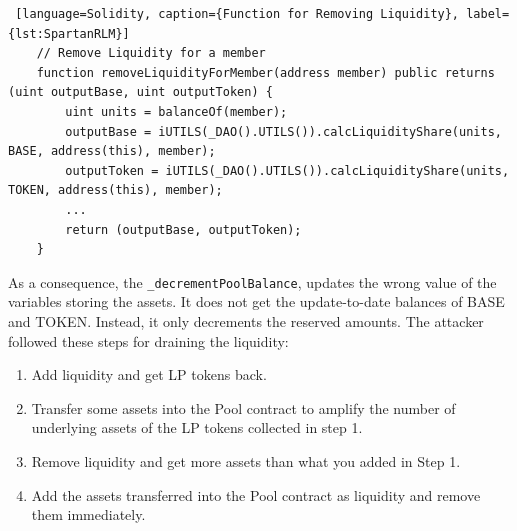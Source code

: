 \begin{lstlisting} [language=Solidity, caption={Function for Removing Liquidity}, label={lst:SpartanRLM}]
    // Remove Liquidity for a member
    function removeLiquidityForMember(address member) public returns (uint outputBase, uint outputToken) {
        uint units = balanceOf(member);
        outputBase = iUTILS(_DAO().UTILS()).calcLiquidityShare(units, BASE, address(this), member);
        outputToken = iUTILS(_DAO().UTILS()).calcLiquidityShare(units, TOKEN, address(this), member);
        ...
        return (outputBase, outputToken);
    }
\end{lstlisting}
As a consequence, the \texttt{\_decrementPoolBalance}, updates the  wrong value of the variables storing the assets. 
It does not get the update-to-date balances of BASE and TOKEN. Instead, it only decrements the reserved amounts.
The attacker followed these steps for draining the liquidity:
\begin{enumerate}
    \item Add liquidity and get LP tokens back.
    \item Transfer some assets into the Pool contract to amplify the number of underlying assets of the LP tokens collected in step 1.
    \item Remove liquidity and get more assets than what you added in Step 1.
    \item Add the assets transferred into the Pool contract as liquidity and remove them immediately.
\end{enumerate}

